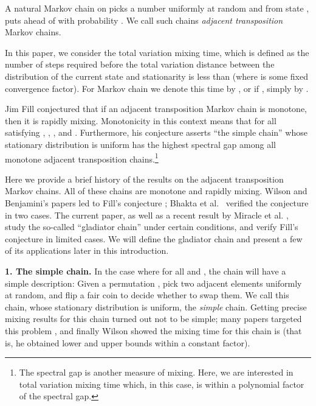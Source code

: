 \documentclass[10 pt]{article}
\begin{document}
\smallskip
A natural Markov chain on  picks a number  uniformly at random and from state , puts 
ahead of  with probability . We call such chains \emph{adjacent transposition} Markov chains. 

\medskip 

In this paper, we consider the total variation mixing time, which is defined as the number of steps required before the total variation distance
between the distribution of the current state and stationarity is less than  (where  is some fixed convergence factor).
For Markov chain  we denote this time by , or if , simply by .
 
\smallskip

Jim Fill \cite{FillConj} conjectured that if an adjacent transposition Markov chain is monotone, then it is rapidly mixing.
Monotonicity in this context means that for all  satisfying , , , and 
  \cite{FillConj}. Furthermore, his conjecture asserts ``the simple chain'' whose stationary distribution is uniform
has the highest spectral gap among all monotone adjacent transposition chains.\footnote{ The spectral gap is another measure of mixing.
Here, we are interested in total variation mixing time which, in this case, is within a polynomial factor of the spectral gap.}

\smallskip

Here we provide a brief history of the results  on the adjacent transposition Markov chains.   All of these chains are monotone and rapidly mixing.
Wilson and Benjamini's papers \cite{Wilson, Benjamini} led to Fill's conjecture \cite{FillConj}; Bhakta et al.\ \cite{Dana} verified the conjecture
in two cases.  The current paper, as well as a recent result by Miracle et al. \cite{SaraAmanda}, study the so-called ``gladiator chain'' under
certain conditions, and verify Fill's conjecture in limited cases. We will define the gladiator chain and present a few of its applications
later in this introduction. 

\medskip

 \textbf{1. The simple chain. } In the case where  for all  and , the chain will have a simple description:
Given a permutation , pick two adjacent elements uniformly at random, and flip a fair coin to decide whether to swap them.
We call this chain, whose stationary distribution is uniform, the \emph{simple} chain. Getting precise mixing results for this chain turned
out not to be simple; many papers targeted this problem \cite{Simple1,ComparisonMethodDiaconis}, and finally Wilson \cite{Wilson} showed
the mixing time for this chain is  (that is, he obtained lower and upper bounds within a constant factor).
 
\end{document}
